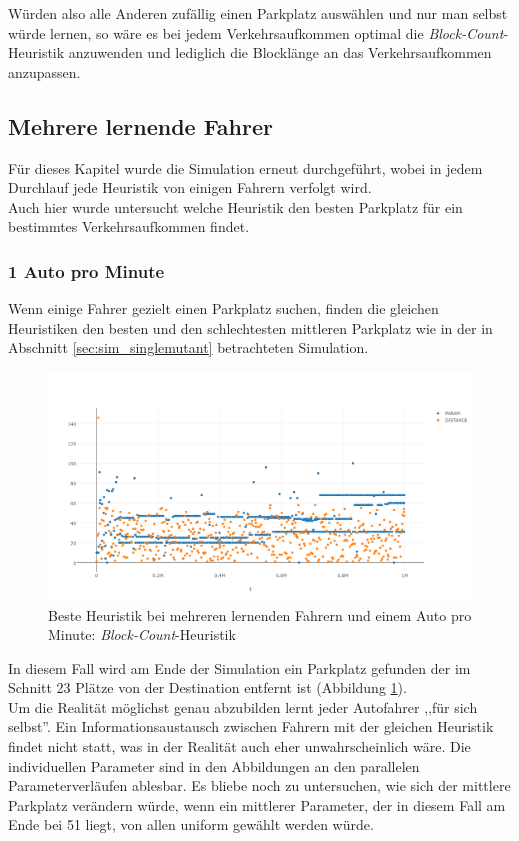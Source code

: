 Würden also alle Anderen zufällig einen Parkplatz auswählen und nur man selbst würde lernen, so wäre es bei jedem Verkehrsaufkommen optimal die \emph{Block-Count}-Heuristik anzuwenden und lediglich die Blocklänge an das Verkehrsaufkommen anzupassen. 

\subsection{Mehrere lernende Fahrer}

Für dieses Kapitel wurde die Simulation erneut durchgeführt, wobei in jedem Durchlauf jede Heuristik von einigen Fahrern verfolgt wird. \\
Auch hier wurde untersucht welche Heuristik den besten Parkplatz für ein bestimmtes Verkehrsaufkommen findet.

\subsubsection{1 Auto pro Minute}\label{sec:sim_pm_1pm}

Wenn einige Fahrer gezielt einen Parkplatz suchen, finden die gleichen Heuristiken den besten und den schlechtesten mittleren Parkplatz wie in der in Abschnitt \ref{sec:sim_singlemutant} betrachteten Simulation. 
\begin{figure}
	\includegraphics[width=\textwidth]{analyse/SomeMutants/1pm/block1some.png}
	\caption{Beste Heuristik bei mehreren lernenden Fahrern und einem Auto pro Minute: \emph{Block-Count}-Heuristik}\label{fig:res_pm_1pm_best}
\end{figure}
In diesem Fall wird am Ende der Simulation ein Parkplatz gefunden der im Schnitt 23 Plätze von der Destination entfernt ist (Abbildung \ref{fig:res_pm_1pm_best}).\\
Um die Realität möglichst genau abzubilden lernt jeder Autofahrer ,,für sich selbst''. Ein Informationsaustausch zwischen Fahrern mit der gleichen Heuristik findet nicht statt, was in der Realität auch eher unwahrscheinlich wäre. Die individuellen Parameter sind in den Abbildungen an den parallelen Parameterverläufen ablesbar. Es bliebe noch zu untersuchen, wie sich der mittlere Parkplatz verändern würde, wenn ein mittlerer Parameter, der in diesem Fall am Ende bei 51 liegt, von allen uniform gewählt werden würde.\\

